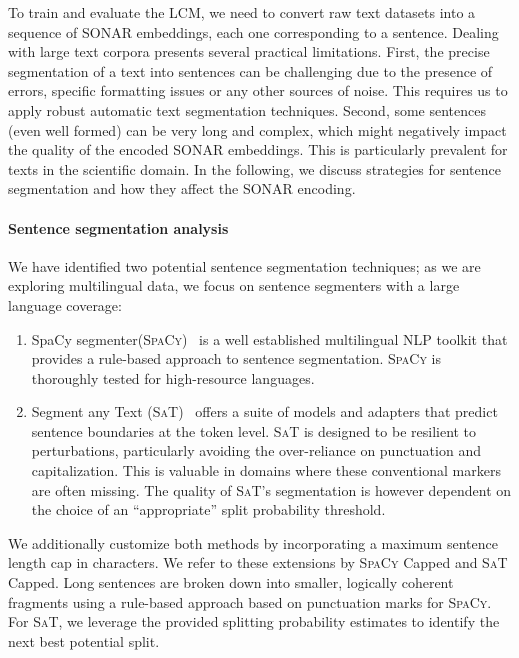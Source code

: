 \documentclass[twoside,11pt]{fairmeta}
\newcommand{\segmenter}{segmenter\xspace}
\newcommand{\segmenters}{segmenters\xspace}
\newcommand{\spacy}{\textsc{SpaCy}\xspace}
\newcommand{\sat}{\textsc{SaT}\xspace}
\newcommand{\sonar}{\textsc{SONAR}\xspace}
\newcommand{\lcm}{\textsc{LCM}\xspace}
\begin{document}
To train and evaluate the \lcm, we need to convert raw text datasets into a sequence of \sonar embeddings, each one corresponding to a sentence.
Dealing with large text corpora presents several practical limitations.
First, the precise segmentation of a text into sentences can be challenging due to the presence of errors, specific formatting issues or any other sources of noise.
This requires us to apply robust automatic text segmentation techniques.
Second, some sentences (even well formed) can be very long and complex, which might negatively impact the quality of the encoded \sonar embeddings.
This is particularly prevalent for texts in the  scientific domain.
In the following, we discuss strategies for sentence segmentation and
how they affect the \sonar encoding.

\vspace{-3mm} %
\paragraph{Sentence segmentation analysis}
\label{sec:data-analysis}

\label{sec:archi:sentence_seg}

We have identified two potential sentence segmentation techniques; as we are exploring multilingual data, we focus on sentence \segmenters with a large language coverage:
\begin{enumerate}
    \item SpaCy \segmenter (\spacy)~\citep{Honnibal_spaCy_Industrial-strength_Natural_2020} is a well established multilingual NLP toolkit that provides a rule-based approach to sentence segmentation. \spacy is thoroughly tested for high-resource languages.
    \item Segment any Text (\sat)~\citep{minixhofer-etal-2023-wheres,frohmann-etal-2024-segment} offers a suite of models and adapters that predict sentence boundaries at the token level.
    \sat is designed to be resilient to perturbations, particularly avoiding the over-reliance on punctuation and capitalization. This is valuable in domains where these conventional markers are often missing. The quality of \sat's segmentation is however dependent on the choice of an ``appropriate'' split probability threshold.
\end{enumerate}

We additionally customize both methods by incorporating a maximum sentence length cap in characters. We refer to these extensions by \spacy Capped and \sat Capped.
Long sentences are broken down into smaller, logically coherent fragments using a rule-based approach based on punctuation marks for \spacy. For \sat, we leverage the provided splitting probability estimates to identify the next best potential split.
\end{document}
